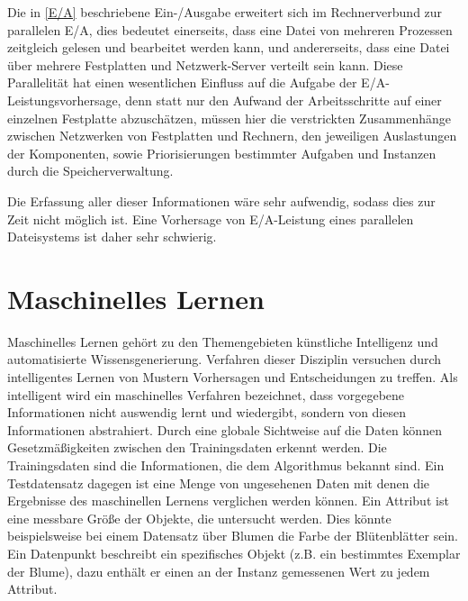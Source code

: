 \documentclass[
	12pt,
	a4paper,
	BCOR10mm,
	DIV14,
	listof=totoc,
	bibliography=totoc,
	headsepline
]{scrreprt}
\begin{document}
Die in \ref{E/A} beschriebene Ein-/Ausgabe erweitert sich im Rechnerverbund zur parallelen E/A, dies bedeutet einerseits, dass eine Datei von mehreren Prozessen zeitgleich gelesen und bearbeitet werden kann, und andererseits, dass eine Datei über mehrere Festplatten und Netzwerk-Server verteilt sein kann. Diese Parallelität hat einen wesentlichen Einfluss auf die Aufgabe der E/A-Leistungsvorhersage, denn statt nur den Aufwand der Arbeitsschritte auf einer einzelnen Festplatte abzuschätzen, müssen hier die verstrickten Zusammenhänge zwischen Netzwerken von Festplatten und Rechnern, den jeweiligen Auslastungen der Komponenten, sowie Priorisierungen bestimmter Aufgaben und Instanzen durch die Speicherverwaltung.

Die Erfassung aller dieser Informationen wäre sehr aufwendig, sodass dies zur Zeit nicht möglich ist. Eine Vorhersage von E/A-Leistung eines parallelen Dateisystems ist daher sehr schwierig.

\section{Maschinelles Lernen}
\label{back_ML}
Maschinelles Lernen gehört zu den Themengebieten künstliche Intelligenz und automatisierte Wissensgenerierung. Verfahren dieser Disziplin versuchen durch intelligentes Lernen von Mustern Vorhersagen und Entscheidungen zu treffen.
Als intelligent wird ein maschinelles Verfahren bezeichnet, dass vorgegebene Informationen nicht auswendig lernt und wiedergibt, sondern von diesen Informationen abstrahiert.
Durch eine globale Sichtweise auf die Daten können Gesetzmäßigkeiten zwischen den Trainingsdaten erkennt werden.
Die Trainingsdaten sind die Informationen, die dem Algorithmus bekannt sind.
Ein Testdatensatz dagegen ist eine Menge von ungesehenen Daten mit denen die Ergebnisse des maschinellen Lernens verglichen werden können.
Ein Attribut ist eine messbare Größe der Objekte, die untersucht werden. Dies könnte beispielsweise bei einem Datensatz über Blumen die Farbe der Blütenblätter sein.
Ein Datenpunkt beschreibt ein spezifisches Objekt (z.B. ein bestimmtes Exemplar der Blume), dazu enthält er einen an der Instanz gemessenen Wert zu jedem Attribut.
\end{document}

